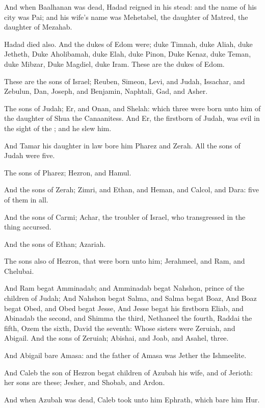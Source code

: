 \Verse And when Baalhanan was dead, Hadad reigned in his stead: and the name of his city was Pai; and his wife's name was Mehetabel, the daughter of Matred, the daughter of Mezahab.

\Verse Hadad died also. And the dukes of Edom were; duke Timnah, duke Aliah, duke Jetheth, \Verse Duke Aholibamah, duke Elah, duke Pinon, \Verse Duke Kenaz, duke Teman, duke Mibzar, \Verse Duke Magdiel, duke Iram.  These are the dukes of Edom.


\Chapter
\Verse These are the sons of Israel; Reuben, Simeon, Levi, and Judah, Issachar, and Zebulun, \Verse Dan, Joseph, and Benjamin, Naphtali, Gad, and Asher.

\Verse The sons of Judah; Er, and Onan, and Shelah: which three were born unto him of the daughter of Shua the Canaanitess. And Er, the firstborn of Judah, was evil in the sight of the \LORD; and he slew him.

\Verse And Tamar his daughter in law bore him Pharez and Zerah. All the sons of Judah were five.

\Verse The sons of Pharez; Hezron, and Hamul.

\Verse And the sons of Zerah; Zimri, and Ethan, and Heman, and Calcol, and Dara: five of them in all.

\Verse And the sons of Carmi; Achar, the troubler of Israel, who transgressed in the thing accursed.

\Verse And the sons of Ethan; Azariah.

\Verse The sons also of Hezron, that were born unto him; Jerahmeel, and Ram, and Chelubai.

\Verse And Ram begat Amminadab; and Amminadab begat Nahshon, prince of the children of Judah; \Verse And Nahshon begat Salma, and Salma begat Boaz, \Verse And Boaz begat Obed, and Obed begat Jesse, \Verse And Jesse begat his firstborn Eliab, and Abinadab the second, and Shimma the third, \Verse Nethaneel the fourth, Raddai the fifth, \Verse Ozem the sixth, David the seventh: \Verse Whose sisters were Zeruiah, and Abigail. And the sons of Zeruiah; Abishai, and Joab, and Asahel, three.

\Verse And Abigail bare Amasa: and the father of Amasa was Jether the Ishmeelite.

\Verse And Caleb the son of Hezron begat children of Azubah his wife, and of Jerioth: her sons are these; Jesher, and Shobab, and Ardon.

\Verse And when Azubah was dead, Caleb took unto him Ephrath, which bare him Hur.

